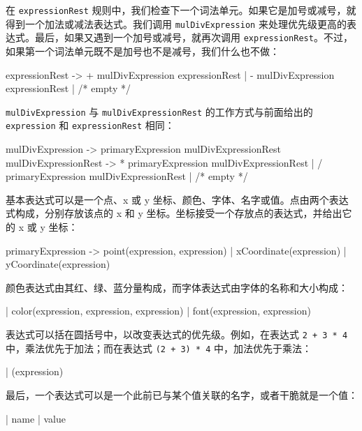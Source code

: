 在 \texttt{expressionRest} 规则中，我们检查下一个词法单元。如果它是加号或减号，就得到一个加法或减法表达式。我们调用 \texttt{mulDivExpression} 来处理优先级更高的表达式。最后，如果又遇到一个加号或减号，就再次调用 \texttt{expressionRest}。不过，如果第一个词法单元既不是加号也不是减号，我们什么也不做：

\begin{codebox}
expressionRest -> + mulDivExpression expressionRest
                | - mulDivExpression expressionRest
                | /* empty */
\end{codebox}

\texttt{mulDivExpression} 与 \texttt{mulDivExpressionRest} 的工作方式与前面给出的 \texttt{expression} 和 \texttt{expressionRest} 相同：

\begin{codebox}
mulDivExpression -> primaryExpression mulDivExpressionRest
mulDivExpressionRest -> * primaryExpression mulDivExpressionRest
                      | / primaryExpression mulDivExpressionRest
                      | /* empty */
\end{codebox}

基本表达式可以是一个点、x 或 y 坐标、颜色、字体、名字或值。点由两个表达式构成，分别存放该点的 x 和 y 坐标。坐标接受一个存放点的表达式，并给出它的 x 或 y 坐标：

\begin{codebox}
primaryExpression -> point(expression, expression)
                   | xCoordinate(expression)
                   | yCoordinate(expression)
\end{codebox}

颜色表达式由其红、绿、蓝分量构成，而字体表达式由字体的名称和大小构成：

\begin{codebox}
                   | color(expression, expression, expression)
                   | font(expression, expression)
\end{codebox}

表达式可以括在圆括号中，以改变表达式的优先级。例如，在表达式 \texttt{2 + 3 * 4} 中，乘法优先于加法；而在表达式 \texttt{(2 + 3) * 4} 中，加法优先于乘法：

\begin{codebox}
                   | (expression)
\end{codebox}

最后，一个表达式可以是一个此前已与某个值关联的名字，或者干脆就是一个值：

\begin{codebox}
                   | name
                   | value
\end{codebox}

